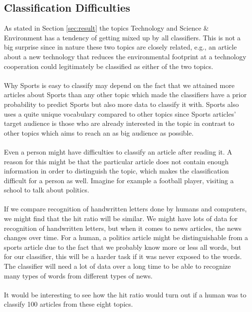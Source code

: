\subsection{Classification Difficulties}
As stated in Section \ref{sec:result} the topics Technology and Science \& Environment has a tendency of getting mixed up by all classifiers. This is not a big surprise since in nature these two topics are closely related, e.g., an article about a new technology that reduces the environmental footprint at a technology cooperation could legitimately be classified as either of the two topics.\\\\
Why Sports is easy to classify may depend on the fact that we attained more articles about Sports than any other topic which made the classifiers have a prior probability to predict Sports but also more data to classify it with. Sports also uses a quite unique vocabulary compared to other topics since Sports articles' target audience is those who are already interested in the topic in contrast to other topics which aims to reach an as big audience as possible.
\\\\
Even a person might have difficulties to classify an article after reading it. A reason for this might be that the particular article does not contain enough information in order to distinguish the topic, which makes the classification difficult for a person as well. Imagine for example a football player, visiting a school to talk about politics.
\\\\
If we compare recognition of handwritten letters done by humans and computers, we might find that the hit ratio will be similar. We might have lots of data for recognition of handwritten letters, but when it comes to news articles, the news changes over time. For a human, a politics article might be distinguishable from a sports article due to the fact that we probably know more or less all words, but for our classifier, this will be a harder task if it was never exposed to the words. The classifier will need a lot of data over a long time to be able to recognize many types of words from different types of news.
\\\\
It would be interesting to see how the hit ratio would turn out if a human was to classify 100 articles from these eight topics. 